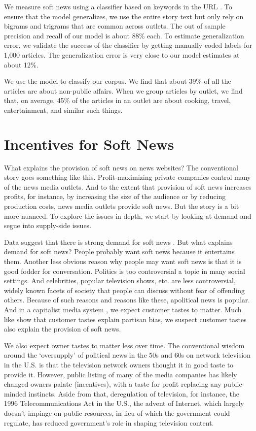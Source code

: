 \documentclass[12pt, letterpaper]{article}
\begin{document}
We measure soft news using a classifier based on keywords in the URL \citep{bakshy2015exposure, flaxman2016filter}. To ensure that the model generalizes, we use the entire story text but only rely on bigrams and trigrams that are common across outlets. The out of sample precision and recall of our model is about 88\% each. To estimate generalization error, we validate the success of the classifier by getting manually coded labels for 1,000 articles. The generalization error is very close to our model estimates at about 12\%.

We use the model to classify our corpus. We find that about 39\% of all the articles are about non-public affairs. When we group articles by outlet, we find that, on average, 45\% of the articles in an outlet are about cooking, travel, entertainment, and similar such things. 

\section*{Incentives for Soft News}
What explains the provision of soft news on news websites? The conventional story goes something like this. Profit-maximizing private companies control many of the news media outlets. And to the extent that provision of soft news increases profits, for instance, by increasing the size of the audience or by reducing production costs, news media outlets provide soft news. But the story is a bit more nuanced. To explore the issues in depth, we start by looking at demand and segue into supply-side issues.

Data suggest that there is strong demand for soft news \citep{arceneaux2013changing, barnhurst1997, flaxman2016filter, guess2016media}. But what explains demand for soft news? People probably want soft news because it entertains them. Another less obvious reason why people may want soft news is that it is good fodder for conversation. Politics is too controversial a topic in many social settings. And celebrities, popular television shows, etc. are less controversial, widely known facets of society that people can discuss without fear of offending others. Because of such reasons and reasons like these, apolitical news is popular. And in a capitalist media system \citep{curran2009media}, we expect customer tastes to matter. Much like \citet{gentzkow2006drives} show that customer tastes explain partisan bias, we suspect customer tastes also explain the provision of soft news.

We also expect owner tastes to matter less over time. The conventional wisdom around the `oversupply' of political news in the 50s and 60s on network television in the U.S. is that the television network owners thought it in good taste to provide it. However, public listing of many of the media companies has likely changed owners palate (incentives), with a taste for profit replacing any public-minded instincts. Aside from that, deregulation of television, for instance, the 1996 Telecommunications Act in the U.S., the advent of Internet, which largely doesn't impinge on public resources, in lieu of which the government could regulate, has reduced government's role in shaping television content. 
\end{document}
